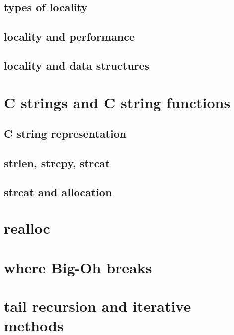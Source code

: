 \subsection{types of locality}

\subsection{locality and performance}

\subsection{locality and data structures}


\section{C strings and C string functions}

\subsection{C string representation}

\subsection{strlen, strcpy, strcat}

\subsection{strcat and allocation}

\section{realloc}

\section{where Big-Oh breaks}

\section{tail recursion and iterative methods}


